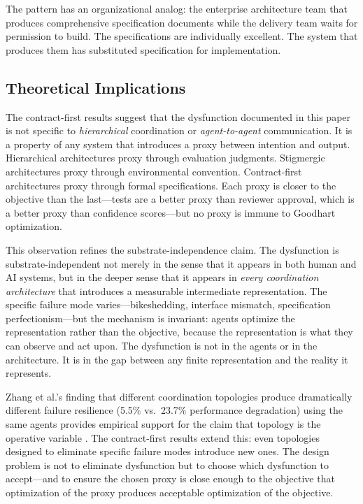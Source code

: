 \documentclass[11pt,a4paper]{article}
\begin{document}
The pattern has an organizational analog: the enterprise architecture team that produces comprehensive specification documents while the delivery team waits for permission to build. The specifications are individually excellent. The system that produces them has substituted specification for implementation.

\subsection{Theoretical Implications}

The contract-first results suggest that the dysfunction documented in this paper is not specific to \emph{hierarchical} coordination or \emph{agent-to-agent} communication. It is a property of any system that introduces a proxy between intention and output. Hierarchical architectures proxy through evaluation judgments. Stigmergic architectures proxy through environmental convention. Contract-first architectures proxy through formal specifications. Each proxy is closer to the objective than the last---tests are a better proxy than reviewer approval, which is a better proxy than confidence scores---but no proxy is immune to Goodhart optimization.

This observation refines the substrate-independence claim. The dysfunction is substrate-independent not merely in the sense that it appears in both human and AI systems, but in the deeper sense that it appears in \emph{every coordination architecture} that introduces a measurable intermediate representation. The specific failure mode varies---bikeshedding, interface mismatch, specification perfectionism---but the mechanism is invariant: agents optimize the representation rather than the objective, because the representation is what they can observe and act upon. The dysfunction is not in the agents or in the architecture. It is in the gap between any finite representation and the reality it represents.

Zhang et al.'s finding that different coordination topologies produce dramatically different failure resilience (5.5\% vs.\ 23.7\% performance degradation) using the same agents provides empirical support for the claim that topology is the operative variable \citep{zhang2025resilience}. The contract-first results extend this: even topologies designed to eliminate specific failure modes introduce new ones. The design problem is not to eliminate dysfunction but to choose which dysfunction to accept---and to ensure the chosen proxy is close enough to the objective that optimization of the proxy produces acceptable optimization of the objective.
\end{document}
